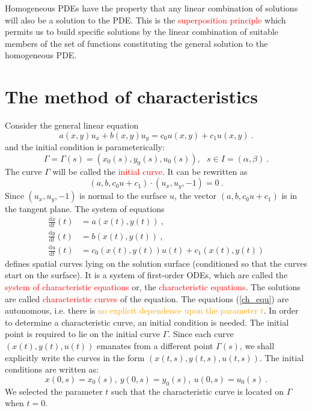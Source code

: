 \documentclass[12pt,a4paper]{article}
\newcommand{\dif}{\mathrm{d}}
\begin{document}
Homogeneous PDEs have the property that any linear combination of solutions will also be a solution to the PDE. This is the \textcolor{red}{superposition principle} which permits us to build specific solutions by the linear combination of suitable members of the set of functions constituting the general solution to the homogeneous PDE.


\section{The method of characteristics}
\cite{pinchover2005introduction} Consider the general linear equation
\begin{equation}
a(x, y) u_x +b(x, y) u_y = c_0u(x, y) +c_1u(x, y) ~.
\end{equation}
and the initial condition is parameterically:
\begin{equation}
\Gamma = \Gamma(s) = (x_0(s), y_0(s), u_0(s) ), ~~~s \in I = (\alpha, \beta) ~.
\end{equation}
The curve $\Gamma$ will be called the \textcolor{red}{initial curve}. It can be rewritten as
\begin{equation}
(a, b, c_0 u+c_1) \cdot (u_x, u_y, -1) = 0 ~.
\end{equation}
Since $(u_x, u_y, -1)$ is normal to the surface $u$, the vector $(a, b, c_0u + c_1)$ is in the tangent plane. The system of equations
\begin{align}
\nonumber \frac{\dif x}{\dif t}(t) &= a(x(t), y(t)) ~, \\
\nonumber \frac{\dif y}{\dif t}(t) &= b(x(t), y(t)) ~, \\
\frac{\dif u}{\dif t}(t) &= c_0(x(t), y(t)) u(t) +c_1(x(t), y(t))
\label{ch_equ}
\end{align}
defines spatial curves lying on the solution surface (conditioned so that the curves start on the surface). It is a system of first-order ODEs, which are called the \textcolor{red}{system of characteristic equations} or, the \textcolor{red}{characteristic equations}. The solutions are called \textcolor{red}{characteristic curves} of the equation. The equations (\ref{ch_equ}) are autonomous, i.e. there is \textcolor{orange}{no explicit dependence upon the parameter $t$}. In order to determine a characteristic curve, an initial condition is needed. The initial point is required to lie on the initial curve $\Gamma$. Since each curve $(x(t),y(t),u(t))$ emanates from a different point $\Gamma(s)$, we shall explicitly write the curves in the form $(x(t, s), y(t, s), u(t, s))$. The initial conditions are written as:
\begin{equation}
x(0, s) = x_0(s), ~y(0, s) = y_0(s), ~u(0, s) = u_0(s) ~.
\end{equation}
We selected the parameter $t$ such that the characteristic curve is located on $\Gamma$ when $t = 0$. 
\end{document}
